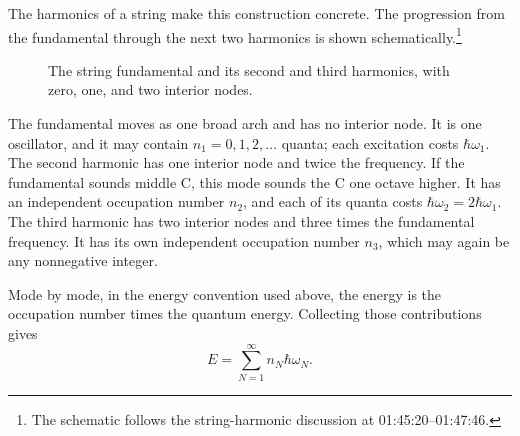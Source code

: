 The harmonics of a string make this construction concrete. The progression from the fundamental through the next two harmonics is shown schematically.\footnote{The schematic follows the string-harmonic discussion at 01:45:20--01:47:46.}

\begin{figure}[t]
\centering
{}
\caption{The string fundamental and its second and third harmonics, with zero, one, and two interior nodes.}
\end{figure}

The fundamental moves as one broad arch and has no interior node. It is one oscillator, and it may contain \(n_1=0,1,2,\ldots\) quanta; each excitation costs \(\hbar\omega_1\). The second harmonic has one interior node and twice the frequency. If the fundamental sounds middle C, this mode sounds the C one octave higher. It has an independent occupation number \(n_2\), and each of its quanta costs \(\hbar\omega_2=2\hbar\omega_1\). The third harmonic has two interior nodes and three times the fundamental frequency. It has its own independent occupation number \(n_3\), which may again be any nonnegative integer.

Mode by mode, in the energy convention used above, the energy is the occupation number times the quantum energy. Collecting those contributions gives
\begin{equation}
E=\sum_{N=1}^{\infty} n_N\hbar\omega_N.
\end{equation}

